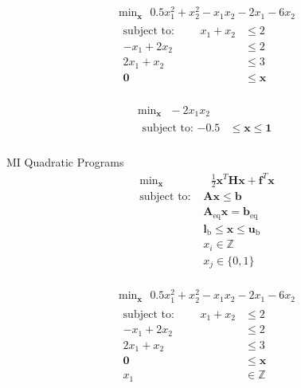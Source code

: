 \documentclass{article}
\begin{document}
\begin{align*}
    \text{min}_{\mathbf{x}} \text{ } 0.5x_1^2 + x_2^2 - x_1x_2 - 2x_1 - 6x_2\\
    \begin{aligned}
    \mbox{subject to: } \qquad x_1 + x_2 &\le 2\\
                        -x_1 + 2x_2 &\le 2\\
                        2x_1 + x_2 &\le 3\\
                        \mathbf{0} &\le \mathbf{x}\\
    \end{aligned}
\end{align*}

\begin{align*}
    \text{min}_{\mathbf{x}} \text{ } -2x_1x_2\\
    \begin{aligned}
    \mbox{subject to: } \mathbf{-0.5} &\le \mathbf{x} \le \mathbf{1} \\
    \end{aligned}
\end{align*}


MI Quadratic Programs
\begin{align*}
    \text{min}_{\mathbf{x}}& \text{ } \frac{1}{2}\mathbf{x}^T \mathbf{H} \mathbf{x} + \mathbf{f}^T \mathbf{x} \\
    \mbox{subject to: }& \mathbf{A}\mathbf{x} \le \mathbf{b}\\
                       & \mathbf{A}_\text{eq}\mathbf{x} = \mathbf{b}_\text{eq}\\
                       & \mathbf{l}_{\text{b}} \le \mathbf{x} \le \mathbf{u}_{\text{b}}\\
                       & x_i \in \mathbb{Z}\\
                       & x_j \in \{0,1\}\\
\end{align*}

\begin{align*}
    \text{min}_{\mathbf{x}} \text{ } 0.5x_1^2 + x_2^2 - x_1x_2 - 2x_1 - 6x_2\\
    \begin{aligned}
    \mbox{subject to: } \qquad x_1 + x_2 &\le 2\\
                        -x_1 + 2x_2 &\le 2\\
                        2x_1 + x_2 &\le 3\\
                        \mathbf{0} &\le \mathbf{x}\\
                        x_1 &\in \mathbb{Z}
    \end{aligned}
\end{align*}
\end{document}
